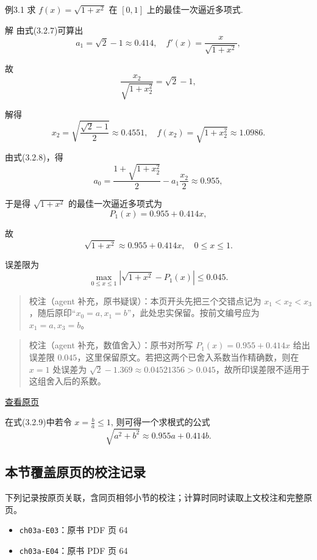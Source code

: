 \documentclass[
  10pt,
  fontset=fandol]{ctexart}
\providecommand{\tightlist}{%
  \setlength{\itemsep}{0pt}\setlength{\parskip}{0pt}}
\begin{document}
例3.1 求 \(f(x) = \sqrt{1+x^2}\) 在 \([0, 1]\) 上的最佳一次逼近多项式.

解 由式(3.2.7)可算出 \[
a_1 = \sqrt{2} - 1 \approx 0.414, \quad f'(x) = \frac{x}{\sqrt{1+x^2}},
\]

故 \[
\frac{x_2}{\sqrt{1+x_2^2}} = \sqrt{2} - 1,
\]

解得 \[
x_2 = \sqrt{\frac{\sqrt{2}-1}{2}} \approx 0.4551, \quad f(x_2) = \sqrt{1+x_2^2} \approx 1.0986.
\]

由式(3.2.8)，得 \[
a_0 = \frac{1 + \sqrt{1+x_2^2}}{2} - a_1 \frac{x_2}{2} \approx 0.955,
\]

于是得 \(\sqrt{1+x^2}\) 的最佳一次逼近多项式为 \[
P_1(x) = 0.955 + 0.414x,
\]

故 \[
\sqrt{1+x^2} \approx 0.955 + 0.414x, \quad 0 \leqslant x \leqslant 1. \tag{3.2.9}
\]

误差限为 \[
\max_{0 \leqslant x \leqslant 1} |\sqrt{1+x^2} - P_1(x)| \leqslant 0.045.
\]

\begin{quote}
校注（agent 补充，原书疑误）：本页开头先把三个交错点记为 \(x_1<x_2<x_3\)，随后原印``\(x_0=a,x_1=b\)''，此处忠实保留。按前文编号应为 \(x_1=a,x_3=b\)。
\end{quote}

\begin{quote}
校注（agent 补充，数值舍入）：原书对所写 \(P_1(x)=0.955+0.414x\) 给出误差限 \(0.045\)，这里保留原文。若把这两个已舍入系数当作精确数，则在 \(x=1\) 处误差为 \(\sqrt2-1.369\approx0.04521356>0.045\)，故所印误差限不适用于这组舍入后的系数。
\end{quote}

\href{../../source-images/pdf-065.jpeg}{查看原页}

在式(3.2.9)中若令 \(x = \frac{b}{a} \leqslant 1\), 则可得一个求根式的公式 \[
\sqrt{a^2 + b^2} \approx 0.955a + 0.414b.
\]

\subsection{本节覆盖原页的校注记录}\label{ux672cux8282ux8986ux76d6ux539fux9875ux7684ux6821ux6ce8ux8bb0ux5f55}

下列记录按原页关联，含同页相邻小节的校注；计算时同时读取上文校注和完整原页。

\begin{itemize}
\tightlist
\item
  \texttt{ch03a-E03}：原书 PDF 页 64
\item
  \texttt{ch03a-E04}：原书 PDF 页 64
\end{itemize}
\end{document}
